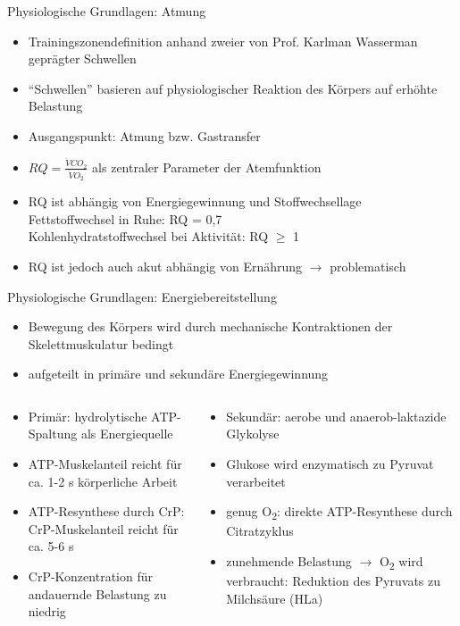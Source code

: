 \documentclass[colorBG,slideColor,9pt]{beamer}
\begin{document}
\begin{frame}{Physiologische Grundlagen: Atmung}
\begin{itemize}
\item Trainingszonendefinition anhand zweier von Prof. Karlman Wasserman geprägter Schwellen
\item "`Schwellen"' basieren auf physiologischer Reaktion des Körpers auf erhöhte Belastung
\item Ausgangspunkt: Atmung bzw. Gastransfer
\item $RQ = \frac{\dot{V}CO_2}{\dot{V}O_2}$ als zentraler Parameter der Atemfunktion
\item RQ ist abhängig von Energiegewinnung und Stoffwechsellage\\Fettstoffwechsel in Ruhe: RQ = 0,7\\Kohlenhydratstoffwechsel bei Aktivität: RQ $\geq$ 1
\item RQ ist jedoch auch akut abhängig von Ernährung $\rightarrow$ problematisch
\end{itemize}
\end{frame}

\begin{frame}{Physiologische Grundlagen: Energiebereitstellung}
\begin{itemize}
\item Bewegung des Körpers wird durch mechanische Kontraktionen der Skelettmuskulatur bedingt
\item aufgeteilt in primäre und sekundäre Energiegewinnung
\end{itemize}
\begin{columns}
\begin{column}[t]{0.5\linewidth}
\begin{itemize}
	\item Primär: hydrolytische ATP-Spaltung als Energiequelle
	\item ATP-Muskelanteil reicht für ca. 1-2 s körperliche Arbeit
	\item ATP-Resynthese durch CrP: CrP-Muskelanteil reicht für ca. 5-6 s
	\item CrP-Konzentration für andauernde Belastung zu niedrig
\end{itemize}
\end{column}
\begin{column}[t]{0.5\linewidth}
\begin{itemize}
	\item Sekundär: aerobe und anaerob-laktazide Glykolyse
	\item Glukose wird enzymatisch zu Pyruvat verarbeitet
	\item genug O\textsubscript{2}: direkte ATP-Resynthese durch Citratzyklus
	\item zunehmende Belastung $\rightarrow$ O\textsubscript{2} wird verbraucht: Reduktion des Pyruvats zu Milchsäure (HLa)
\end{itemize}
\end{column}
\end{columns}
\end{frame}
\end{document}
